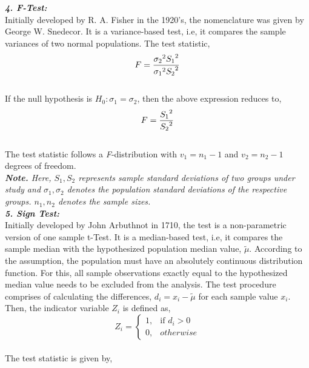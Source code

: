 \documentclass[12pt,a4paper]{report}
\begin{document}
\Large{{\textbf{\textit{4. F-Test: }}} }\\[10 pt]
\Large{Initially developed by R. A. Fisher in the 1920's, the nomenclature was given by George W. Snedecor. It is a variance-based test, i.e, it compares the sample variances of two normal populations. The test statistic,}\\[0.5pt]
\begin{equation}
F = \frac{{\sigma_2}^2{S_1}^2}{{\sigma_1}^2{S_2}^2}\\
\end{equation}\\[0.5pt]
\Large{If the null hypothesis is $H_0:\sigma_1 = \sigma_2$, then the above expression reduces to,}\\[0.1pt]
\begin{equation}
F = \frac{{S_1}^2}{{S_2}^2}\\
\end{equation}\\[0.1pt]
\Large{The test statistic follows a \textit{F}-distribution with $v_1=n_1-1$ and $v_2=n_2-1$ degrees of freedom.}\\[10pt]
\large{\textit{{\textbf{Note.}} Here, $S_1,S_2$ represents sample standard deviations of two groups under study and $\sigma_1,\sigma_2$ denotes the population standard deviations of the respective groups. $n_1,n_2$ denotes the sample sizes.}}\\[20pt]
\Large{{\textbf{\textit{5. Sign Test: }}} }\\[10pt]
\Large{Initially developed by John Arbuthnot in 1710, the test is a non-parametric version of one sample t-Test. It is a median-based test, i.e, it compares the sample median with the hypothesized population median value, $\tilde{\mu}$. According to the assumption, the population must have an absolutely continuous distribution function. For this, all sample observations exactly equal to the hypothesized median value needs to be excluded from the analysis. The test procedure comprises of calculating the differences, $d_i = x_i-\tilde{\mu}$ for each sample value $x_i$. Then, the indicator variable $Z_i$ is defined as,}\\[10pt]
\begin{equation*}
Z_i = 
 \begin{cases}
 1, & \text{if $d_i>0$}\\
 0, & otherwise
 \end{cases}
\end{equation*}\\[10pt]
\Large{The test statistic is given by,}
\end{document}
